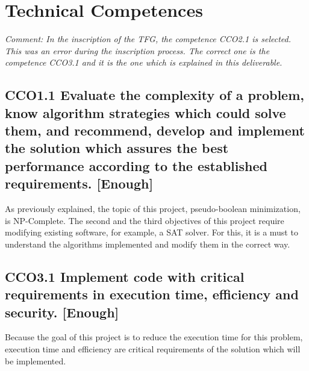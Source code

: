 
\chapter{Technical Competences} %

\label{Chapter5} %
\emph{Comment: In the inscription of the TFG, the competence CCO2.1 is selected. This was an error during the inscription process. The correct one is the competence CCO3.1 and it is the one which is explained in this deliverable. }
\section{CCO1.1  Evaluate the complexity of a problem, know algorithm strategies which could solve them, and recommend, develop and implement the solution which assures the best performance according to the established requirements. [Enough]}
As previously explained, the topic of this project, pseudo-boolean minimization, is NP-Complete. The second and the third objectives of this project require modifying existing software, for example, a SAT solver. For this, it is a must to understand the algorithms implemented and modify them in the correct way. 

\section{CCO3.1	 Implement code with critical requirements in execution time, efficiency and security. [Enough]}
Because the goal of this project is to reduce the execution time for this problem, execution time and efficiency are critical requirements of the solution which will be implemented. 